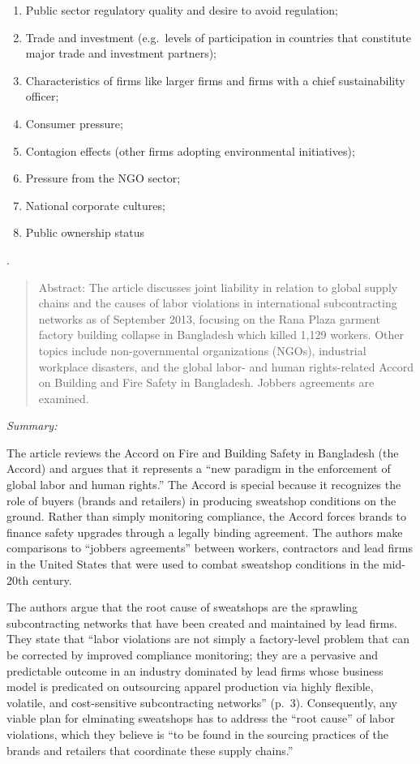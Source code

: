 \documentclass[
  12pt,
]{article}
\providecommand{\tightlist}{%
  \setlength{\itemsep}{0pt}\setlength{\parskip}{0pt}}
\begin{document}
\begin{enumerate}
\def\labelenumi{\arabic{enumi}.}
\tightlist
\item
  Public sector regulatory quality and desire to avoid regulation;
\item
  Trade and investment (e.g.~levels of participation in countries that
  constitute major trade and investment partners);
\item
  Characteristics of firms like larger firms and firms with a chief
  sustainability officer;
\item
  Consumer pressure;
\item
  Contagion effects (other firms adopting environmental initiatives);
\item
  Pressure from the NGO sector;
\item
  National corporate cultures;
\item
  Public ownership status
\end{enumerate}

\bigbreak

.

\begin{quote}
Abstract: 
The article discusses joint liability in relation to global supply chains and the causes of labor violations in international subcontracting networks as of September 2013, focusing on the Rana Plaza garment factory building collapse in Bangladesh which killed 1,129 workers. Other topics include non-governmental organizations (NGOs), industrial workplace disasters, and the global labor- and human rights-related Accord on Building and Fire Safety in Bangladesh. Jobbers agreements are examined.
\end{quote}

\emph{Summary:}

The article reviews the Accord on Fire and Building Safety in Bangladesh
(the Accord) and argues that it represents a ``new paradigm in the
enforcement of global labor and human rights.'' The Accord is special
because it recognizes the role of buyers (brands and retailers) in
producing sweatshop conditions on the ground. Rather than simply
monitoring compliance, the Accord forces brands to finance safety
upgrades through a legally binding agreement. The authors make
comparisons to ``jobbers agreements'' between workers, contractors and
lead firms in the United States that were used to combat sweatshop
conditions in the mid-20th century.

The authors argue that the root cause of sweatshops are the sprawling
subcontracting networks that have been created and maintained by lead
firms. They state that ``labor violations are not simply a factory-level
problem that can be corrected by improved compliance monitoring; they
are a pervasive and predictable outcome in an industry dominated by lead
firms whose business model is predicated on outsourcing apparel
production via highly flexible, volatile, and cost-sensitive
subcontracting networks'' (p.~3). Consequently, any viable plan for
elminating sweatshops has to address the ``root cause'' of labor
violations, which they believe is ``to be found in the sourcing
practices of the brands and retailers that coordinate these supply
chains.''
\end{document}
